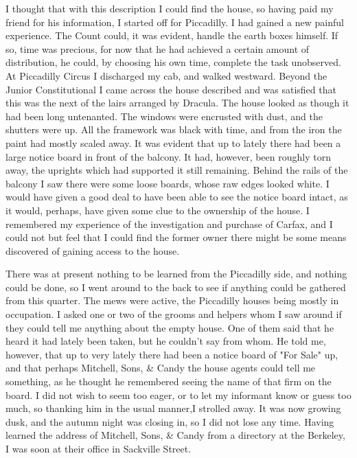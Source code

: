 I thought that with this description I could find the house, so having paid my friend for his information, I started off for Piccadilly. I had gained a new painful experience. The Count could, it was evident, handle the earth boxes himself. If so, time was precious, for now that he had achieved a certain amount of distribution, he could, by choosing his own time, complete the task unobserved. At Piccadilly Circus I discharged my cab, and walked westward. Beyond the Junior Constitutional I came across the house described and was satisfied that this was the next of the lairs arranged by Dracula. The house looked as though it had been long untenanted. The windows were encrusted with dust, and the shutters were up. All the framework was black with time, and from the iron the paint had mostly scaled away. It was evident that up to lately there had been a large notice board in front of the balcony. It had, however, been roughly torn away, the uprights which had supported it still remaining. Behind the rails of the balcony I saw there were some loose boards, whose raw edges looked white. I would have given a good deal to have been able to see the notice board intact, as it would, perhaps, have given some clue to the ownership of the house. I remembered my experience of the investigation and purchase of Carfax, and I could not but feel that I could find the former owner there might be some means discovered of gaining access to the house. 

There was at present nothing to be learned from the Piccadilly side, and nothing could be done, so I went around to the back to see if anything could be gathered from this quarter. The mews were active, the Piccadilly houses being mostly in occupation. I asked one or two of the grooms and helpers whom I saw around if they could tell me anything about the empty house. One of them said that he heard it had lately been taken, but he couldn't say from whom. He told me, however, that up to very lately there had been a notice board of "For Sale" up, and that perhaps Mitchell, Sons, & Candy the house agents could tell me something, as he thought he remembered seeing the name of that firm on the board. I did not wish to seem too eager, or to let my informant know or guess too much, so thanking him in the usual manner,I strolled away. It was now growing dusk, and the autumn night was closing in, so I did not lose any time. Having learned the address of Mitchell, Sons, & Candy from a directory at the Berkeley, I was soon at their office in Sackville Street. 

